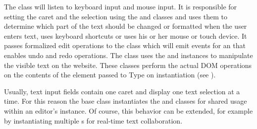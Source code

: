 
\noindent The  class will listen to keyboard input and mouse input. It is responsible for setting the caret and the selection using the  and  classes and uses them to determine which part of the text should be changed or formatted when the user enters text, uses keyboard shortcuts or uses his or her mouse or touch device. It passes formalized edit operations to the  class which will emit events for an  that enables undo and redo operations. The  class uses the  and  instances to manipulate the visible text on the website. These classes perform the actual DOM operations on the contents of the element passed to Type on instantiation (see ).


Usually, text input fields contain one caret and display one text selection at a time. For this reason the  base class instantiates the  and  classes for shared usage within an editor's instance. Of course, this behavior can be extended, for example by instantiating multiple s for real-time text collaboration.





